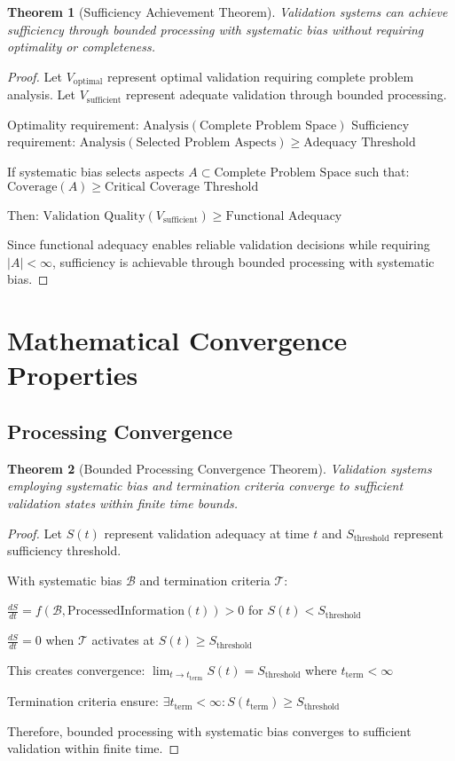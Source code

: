 \documentclass[12pt,a4paper]{article}
\newtheorem{theorem}{Theorem}
\begin{document}
\begin{theorem}[Sufficiency Achievement Theorem]
Validation systems can achieve sufficiency through bounded processing with systematic bias without requiring optimality or completeness.
\end{theorem}

\begin{proof}
Let $V_{\text{optimal}}$ represent optimal validation requiring complete problem analysis.
Let $V_{\text{sufficient}}$ represent adequate validation through bounded processing.

Optimality requirement: $\text{Analysis}(\text{Complete Problem Space})$
Sufficiency requirement: $\text{Analysis}(\text{Selected Problem Aspects}) \geq \text{Adequacy Threshold}$

If systematic bias selects aspects $A \subset \text{Complete Problem Space}$ such that:
$\text{Coverage}(A) \geq \text{Critical Coverage Threshold}$

Then: $\text{Validation Quality}(V_{\text{sufficient}}) \geq \text{Functional Adequacy}$

Since functional adequacy enables reliable validation decisions while requiring $|A| < \infty$, sufficiency is achievable through bounded processing with systematic bias.
\end{proof}

\section{Mathematical Convergence Properties}

\subsection{Processing Convergence}

\begin{theorem}[Bounded Processing Convergence Theorem]
Validation systems employing systematic bias and termination criteria converge to sufficient validation states within finite time bounds.
\end{theorem}

\begin{proof}
Let $S(t)$ represent validation adequacy at time $t$ and $S_{\text{threshold}}$ represent sufficiency threshold.

With systematic bias $\mathcal{B}$ and termination criteria $\mathcal{T}$:

$\frac{dS}{dt} = f(\mathcal{B}, \text{ProcessedInformation}(t)) > 0$ for $S(t) < S_{\text{threshold}}$

$\frac{dS}{dt} = 0$ when $\mathcal{T}$ activates at $S(t) \geq S_{\text{threshold}}$

This creates convergence: $\lim_{t \to t_{\text{term}}} S(t) = S_{\text{threshold}}$ where $t_{\text{term}} < \infty$

Termination criteria ensure: $\exists t_{\text{term}} < \infty : S(t_{\text{term}}) \geq S_{\text{threshold}}$

Therefore, bounded processing with systematic bias converges to sufficient validation within finite time.
\end{proof}
\end{document}
